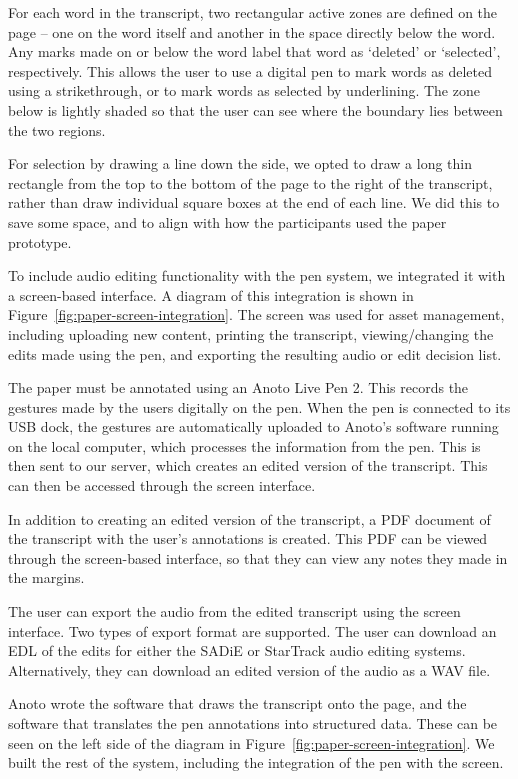 For each word in the transcript, two rectangular active zones are defined on the page -- one on the word itself and
another in the space directly below the word.  Any marks made on or below the word label that word as `deleted' or
`selected', respectively.  This allows the user to use a digital pen to mark words as deleted using a strikethrough, or
to mark words as selected by underlining.  The zone below is lightly shaded so that the user can see where the boundary
lies between the two regions.

For selection by drawing a line down the side, we opted to draw a long thin rectangle from the top to the bottom of the
page to the right of the transcript, rather than draw individual square boxes at the end of each line. We did this to
save some space, and to align with how the participants used the paper prototype.

To include audio editing functionality with the pen system, we integrated it with a screen-based interface. A diagram
of this integration is shown in Figure~\ref{fig:paper-screen-integration}. The screen was used for asset management,
including uploading new content, printing the transcript, viewing/changing the edits made using the pen, and exporting
the resulting audio or edit decision list.

The paper must be annotated using an Anoto Live Pen 2. This records the gestures made by the users digitally on the
pen.  When the pen is connected to its USB dock, the gestures are automatically uploaded to Anoto's software running
on the local computer, which processes the information from the pen. This is then sent to our server, which creates an
edited version of the transcript. This can then be accessed through the screen interface.

In addition to creating an edited version of the transcript, a PDF document of the transcript with the user's
annotations is created. This PDF can be viewed through the screen-based interface, so that they can view any notes
they made in the margins.

The user can export the audio from the edited transcript using the screen interface. Two types of export format are
supported. The user can download an EDL of the edits for either the SADiE or StarTrack audio editing systems.
Alternatively, they can download an edited version of the audio as a WAV file.

Anoto wrote the software that draws the transcript onto the page, and the software that translates the pen annotations
into structured data. These can be seen on the left side of the diagram in Figure~\ref{fig:paper-screen-integration}.
We built the rest of the system, including the integration of the pen with the screen.

